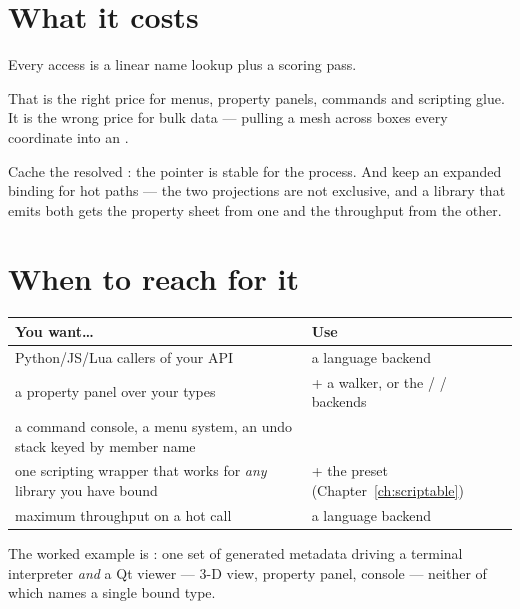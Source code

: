 \section{What it costs}

Every access is a linear name lookup plus a scoring pass.

That is the right price for menus, property panels, commands and scripting
glue. It is the wrong price for bulk data --- pulling a mesh across boxes every
coordinate into an .

\begin{note}
Cache the resolved : the pointer is stable for the process.
And keep an expanded binding for hot paths --- the two projections are not
exclusive, and a library that emits both gets the property sheet from one and
the throughput from the other.
\end{note}

\section{When to reach for it}

\begin{center}
\small
\begin{tabular}{@{}L{6.4cm}L{7.0cm}@{}}
\toprule
\textbf{You want\ldots} & \textbf{Use} \\
\midrule
Python/JS/Lua callers of your API & a language backend \\
a property panel over your types &  + a walker, or the
   /  /  backends \\
a command console, a menu system, an undo stack keyed by member name &
   \\
one scripting wrapper that works for \emph{any} library you have bound &
   + the  preset (Chapter~\ref{ch:scriptable}) \\
maximum throughput on a hot call & a language backend \\
\bottomrule
\end{tabular}
\end{center}

The worked example is : one set of generated metadata
driving a terminal interpreter \emph{and} a Qt viewer --- 3-D view, property
panel, console --- neither of which names a single bound type.
